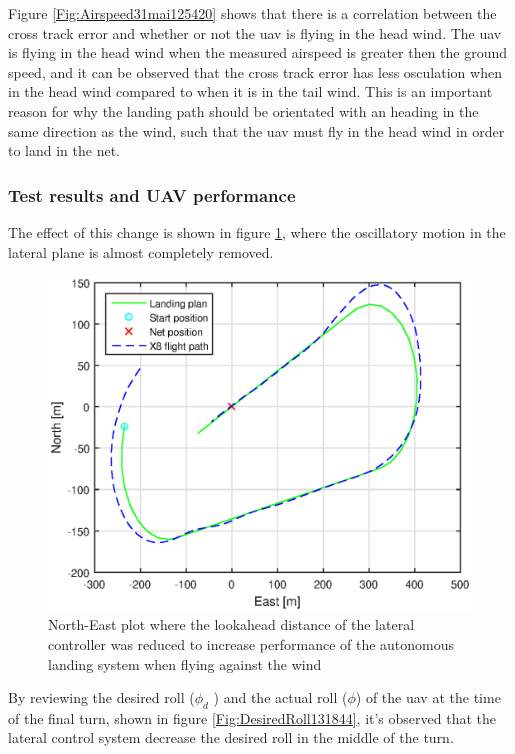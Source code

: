 Figure \ref{Fig:Airspeed31mai125420} shows that there is a correlation between the cross track error and whether or not the \gls{uav} is flying in the head wind. The \gls{uav} is flying in the head wind when the measured airspeed is greater then the ground speed, and it can be observed that the cross track error has less osculation when in the head wind compared to when it is in the tail wind. This is an important reason for why the landing path should be orientated with an heading in the same direction as the wind, such that the \gls{uav} must fly in the head wind in order to land in the net.
\subsubsection{Test results and UAV performance}
The effect of this change is shown in figure \ref{Fig:NorthEast31mai131844}, where the oscillatory motion in the lateral plane is almost completely removed.
\begin{figure}[H]
\centering
\includegraphics[scale=0.7]{figs/Experiment/NorthEast31mai131844.eps}
\caption{North-East plot where the lookahead distance of the lateral controller was reduced to increase performance of the autonomous landing system when flying against the wind}
\label{Fig:NorthEast31mai131844}
\end{figure}
By reviewing the desired roll ($\phi_d$ ) and the actual roll ($\phi$) of the \gls{uav} at the time of the final turn, shown in figure \ref{Fig:DesiredRoll131844}, it's observed that the lateral control system decrease the desired roll in the middle of the turn.
